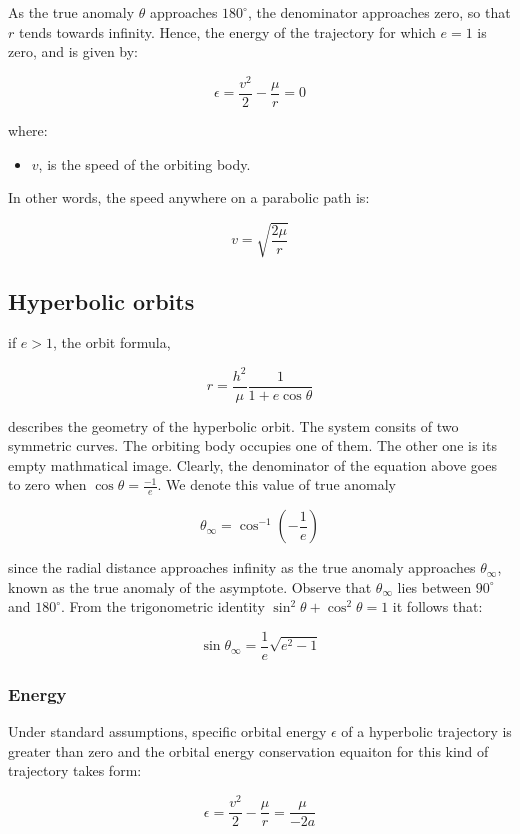 \documentclass[12pt]{article}
\begin{document}
As the true anomaly \(\theta\) approaches \(180^{\circ}\), the denominator approaches zero, so that \(r\) tends towards infinity. Hence, the energy of the trajectory for which \(e=1\) is zero, and is given by:

\[\epsilon=\frac{v^2}{2}-\frac{\mu}{r}=0\]

where:

\begin{itemize}
  \item \(v\), is the speed of the orbiting body.
\end{itemize}

In other words, the speed anywhere on a parabolic path is:

\[v=\sqrt{\frac{2\mu}{r}}\]

\subsection{Hyperbolic orbits}

if \(e>1\), the orbit formula,

\[r=\frac{h^2}{\mu}\frac{1}{1+e\cos\theta}\]

describes the geometry of the hyperbolic orbit. The system consits of two symmetric curves. The orbiting body occupies one of them. The other one is its empty mathmatical image. Clearly, the denominator of the equation above goes to zero when \(\cos\theta=\frac{-1}{e}\). We denote this value of true anomaly

\[\theta_{\infty}=\cos^{-1}\left(-{\frac{1}{e}}\right)\]

since the radial distance approaches infinity as the true anomaly approaches \(\theta_{\infty}\), known as the true anomaly of the asymptote. Observe that \(\theta_{\infty}\) lies between \(90^{\circ}\) and \(180^{\circ}\). From the trigonometric identity \(\sin^{2}\theta+\cos^{2}\theta=1\) it follows that:

\[\sin\theta_{\infty}=\frac{1}{e}\sqrt{e^{2}-1}\]

\subsubsection{Energy}

Under standard assumptions, specific orbital energy \(\epsilon\) of a hyperbolic trajectory is greater than zero and the orbital energy conservation equaiton for this kind of trajectory takes form:

\[\epsilon=\frac{v^2}{2}-\frac{\mu}{r}=\frac{\mu}{-2a}\]
\end{document}
